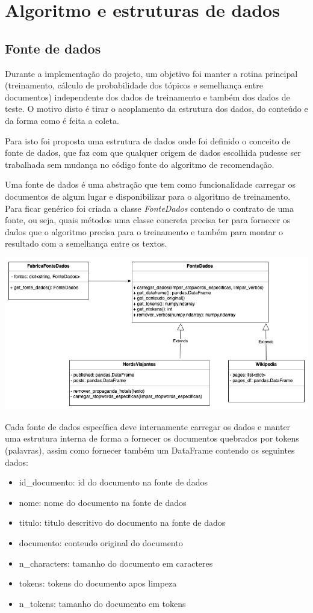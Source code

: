 \section{Algoritmo e estruturas de dados}

\subsection{Fonte de dados}
Durante a implementação do projeto, um objetivo foi manter a rotina principal (treinamento, cálculo de probabilidade dos tópicos e semelhança entre documentos) independente dos dados de treinamento e também dos dados de teste. O motivo disto é tirar o acoplamento da estrutura dos dados, do conteúdo e da forma como é feita a coleta.

Para isto foi proposta uma estrutura de dados onde foi definido o conceito de fonte de dados, que faz com que qualquer origem de dados escolhida pudesse ser trabalhada sem mudança no código fonte do algoritmo de recomendação.

Uma fonte de dados é uma abstração que tem como funcionalidade carregar os documentos de algum lugar e disponibilizar para o algoritmo de treinamento. Para ficar genérico foi criada a classe \textit{FonteDados} contendo o contrato de uma fonte, ou seja, quais métodos uma classe concreta precisa ter para fornecer os dados que o algoritmo precisa para o treinamento e também para montar o resultado com a semelhança entre os textos.

\includegraphics[scale=0.5]{fonte_dados.png}

Cada fonte de dados específica deve internamente carregar os dados e manter uma estrutura interna de forma a fornecer os documentos quebrados por tokens (palavras), assim como fornecer também um DataFrame contendo os seguintes dados:

\begin{itemize}
    \item id\_documento: id do documento na fonte de dados
    \item nome: nome do documento na fonte de dados
    \item titulo: titulo descritivo do documento na fonte de dados
    \item documento: conteudo original do documento
    \item n\_characters: tamanho do documento em caracteres
    \item tokens: tokens do documento apos limpeza
    \item n\_tokens: tamanho do documento em tokens
\end{itemize}

